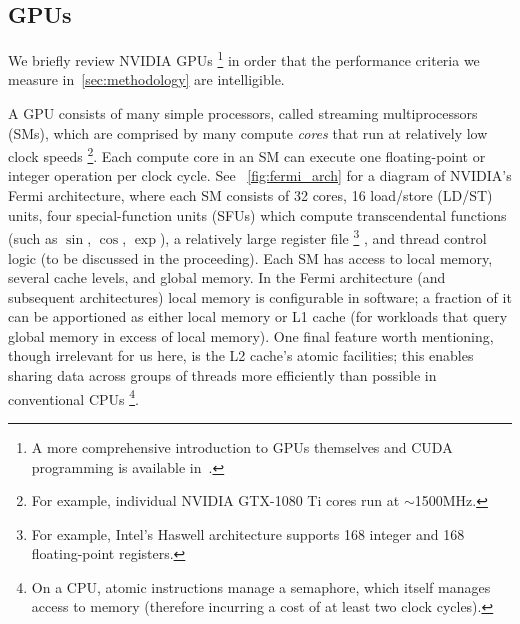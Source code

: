 \subsection{GPUs}\label{subsec:gpus}

We briefly review NVIDIA GPUs%
\footnote{A more comprehensive introduction to GPUs themselves and CUDA programming is available in~\cite{10.5555/2935593}.}
in order that the performance criteria we measure in~\cref{sec:methodology} are intelligible.

A GPU consists of many simple processors, called streaming multiprocessors (SMs), which are comprised by many compute \textit{cores} that run at relatively low clock speeds%
\footnote{For example, individual NVIDIA GTX-1080 Ti cores run at $\sim$1500MHz.}.
Each compute core in an SM can execute one floating-point or integer operation per clock cycle.
See ~\cref{fig:fermi_arch} for a diagram of NVIDIA's Fermi architecture, where each SM consists of 32 cores, 16 load/store (LD/ST) units, four special-function units (SFUs) which compute transcendental functions (such as $\sin$, $\cos$, $\exp$), a relatively large register file%
\footnote{For example, Intel's Haswell architecture supports 168 integer and 168 floating-point registers.}%
, and thread control logic (to be discussed in the proceeding).
Each SM has access to local memory, several cache levels, and global memory.
In the Fermi architecture (and subsequent architectures) local memory is configurable in software;
a fraction of it can be apportioned as either local memory or L1 cache (for workloads that query global memory in excess of local memory).
One final feature worth mentioning, though irrelevant for us here, is the L2 cache's atomic  facilities;
this enables sharing data across groups of threads more efficiently than possible in conventional CPUs%
\footnote{On a CPU, atomic  instructions manage a semaphore, which itself manages access to memory (therefore incurring a cost of at least two clock cycles).}.

